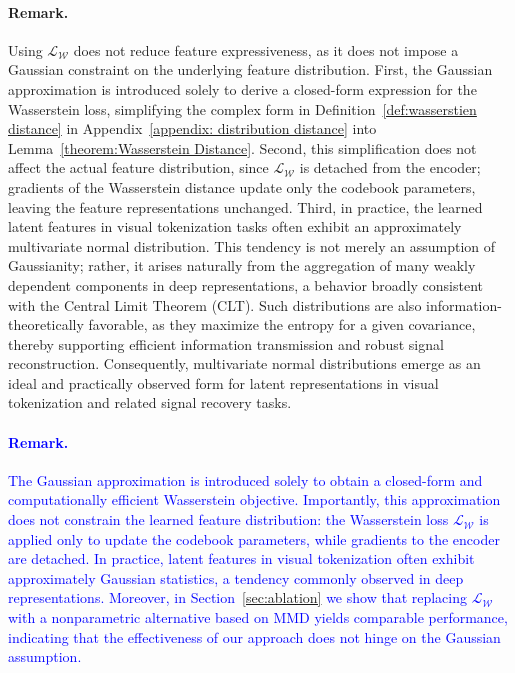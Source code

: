 \paragraph{Remark.} Using $\mathcal{L}_{\mathcal{W}}$ does not reduce feature expressiveness, as it does not impose a Gaussian constraint on the underlying feature distribution. First, the Gaussian approximation is introduced solely to derive a closed-form expression for the Wasserstein loss, simplifying the complex form in Definition~\ref{def:wasserstien distance} in Appendix~\ref{appendix: distribution distance} into Lemma~\ref{theorem:Wasserstein Distance}. Second, this simplification does not affect the actual feature distribution, since $\mathcal{L}_{\mathcal{W}}$ is detached from the encoder; gradients of the Wasserstein distance update only the codebook parameters, leaving the feature representations unchanged. Third, in practice, the learned latent features in visual tokenization tasks often exhibit an approximately multivariate normal distribution. This tendency is not merely an assumption of Gaussianity; rather, it arises naturally from the aggregation of many weakly dependent components in deep representations, a behavior broadly consistent with the Central Limit Theorem (CLT). Such distributions are also information-theoretically favorable, as they maximize the entropy for a given covariance, thereby supporting efficient information transmission and robust signal reconstruction. Consequently, multivariate normal distributions emerge as an ideal and practically observed form for latent representations in visual tokenization and related signal recovery tasks.

\textcolor{blue}{\paragraph{Remark.}
The Gaussian approximation is introduced solely to obtain a closed-form and computationally efficient Wasserstein objective. Importantly, this approximation does not constrain the learned feature distribution: the Wasserstein loss $\mathcal{L}_{\mathcal{W}}$ is applied only to update the codebook parameters, while gradients to the encoder are detached. In practice, latent features in visual tokenization often exhibit approximately Gaussian statistics, a tendency commonly observed in deep representations. Moreover, in Section~\ref{sec:ablation} we show that replacing $\mathcal{L}_{\mathcal{W}}$ with a nonparametric alternative based on MMD yields comparable performance, indicating that the effectiveness of our approach does not hinge on the Gaussian assumption.}

